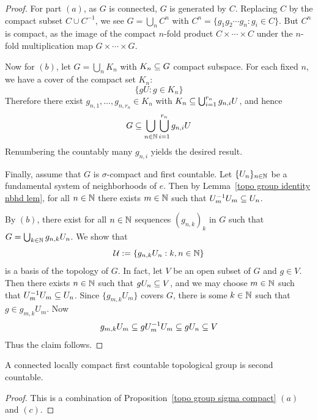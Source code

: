 \begin{proof}
For part $(a)$, as $G$ is connected, $G$ is generated by $C$. Replacing $C$ by the compact subset $C\cup C^{-1}$, we see $G=\bigcup_nC^n$ with $C^n=\{g_1g_2\cdots g_n:g_i\in C\}$. But $C^n$ is compact, as the image of the compact $n$-fold product $C\times\cdots\times C$ under the $n$-fold multiplication map $G\times\cdots\times G$.\par
Now for $(b)$, let $G=\bigcup_nK_n$ with $K_n\subseteq G$ compact subspace. For each fixed $n$, we have a cover of the compact set $K_n$:
\[\{gU:g\in K_n\}\] 
Therefore there exist $g_{n,1},\dots,g_{n,r_n}\in K_n$ with $K_n\subseteq\bigcup_{i=1}^{r_n}g_{n,i}U$, and hence
\[G\subseteq\bigcup_{n\in\mathbb{N}}\bigcup_{i=1}^{r_n}g_{n,i}U\] 
Renumbering the countably many $g_{n,i}$ yields the desired result.\par
Finally, assume that $G$ is $\sigma$-compact and first countable. Let $\{U_n\}_{n\in\mathbb{N}}$ be a fundamental system of neighborhoods of $e$. Then by 
Lemma~\ref{topo group identity nbhd lem}, for all $n\in\mathbb{N}$ there exists $m\in\mathbb{N}$ such that $U^{-1}_mU_m\subseteq U_n$.\par 
By $(b)$, there exist for all $n\in\mathbb{N}$ sequences $(g_{n,k})_k$ in $G$ such that $G=\bigcup_{k\in\mathbb{N}}g_{n,k}U_n$. We show that 
\[\mathcal{U}:=\{g_{n,k}U_n:k,n\in\mathbb{N}\}\]
is a basis of the topology of $G$. In fact, let $V$ be an open subset of $G$ and $g\in V$. Then there exists $n\in\mathbb{N}$ such that $gU_n\subseteq V$, and we may choose $m\in\mathbb{N}$ such that $U^{-1}_mU_m\subseteq U_n$. Since $\{g_{m,k}U_m\}$ covers $G$, there is some $k\in\mathbb{N}$ such that $g\in g_{m,k}U_m$. Now
\[g_{m,k}U_m\subseteq gU_m^{-1}U_m\subseteq gU_n\subseteq V\]
Thus the claim follows.
\end{proof}
\begin{corollary}
A connected locally compact first countable topological group is second countable.
\end{corollary}
\begin{proof}
This is a combination of Proposition~\ref{topo group sigma compact} $(a)$ and $(c)$.
\end{proof}
